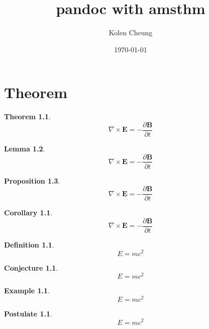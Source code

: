 \documentclass[12pt,english,letterpaper,oneside, article]{memoir}
\title{pandoc with amsthm}
\author{Kolen Cheung}
\date{\today}
\theoremstyle{plain} %
\newtheorem{theorem}{Theorem}[chapter]
\newtheorem{lemma}[theorem]{Lemma}
\newtheorem{proposition}[theorem]{Proposition}
\newtheorem*{corollary}{Corollary}
\theoremstyle{definition}
\newtheorem{definition}{Definition}[chapter]
\newtheorem{conjecture}{Conjecture}[chapter]
\newtheorem{example}{Example}[chapter]
\newtheorem{postulate}{Postulate}[chapter]
\theoremstyle{remark}
\begin{document}
\maketitle

{
\hypersetup{linkcolor=blue}
\setcounter{tocdepth}{5}
\tableofcontents
}
\chapter{Theorem}\label{theorem}

\begin{theorem}

\[\nabla \times \mathbf{E} = - \frac{\partial \mathbf{B}}{\partial t}\]

\end{theorem}

\begin{lemma}

\[\nabla \times \mathbf{E} = - \frac{\partial \mathbf{B}}{\partial t}\]

\end{lemma}

\begin{proposition}

\[\nabla \times \mathbf{E} = - \frac{\partial \mathbf{B}}{\partial t}\]

\end{proposition}

\begin{corollary}

\[\nabla \times \mathbf{E} = - \frac{\partial \mathbf{B}}{\partial t}\]

\end{corollary}

\begin{definition}

\[E=mc^2\]

\end{definition}

\begin{conjecture}

\[E=mc^2\]

\end{conjecture}

\begin{example}

\[E=mc^2\]

\end{example}

\begin{postulate}

\[E=mc^2\]

\end{postulate}
\end{document}
